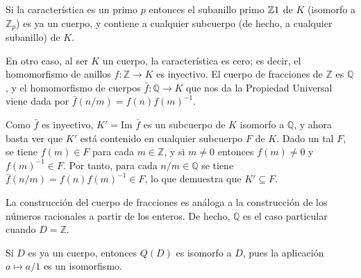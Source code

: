 \begin{proofbox}
Si la característica es un primo \(p\) entonces el subanillo primo \(\mathbb{Z}1\) de \(K\) (isomorfo a \(\mathbb{Z}_p\)) es ya un cuerpo, y contiene a cualquier subcuerpo (de hecho, a cualquier subanillo) de \(K\).

En otro caso, al ser \(K\) un cuerpo, la característica es cero; es decir, el homomorfismo de anillos \(f: \mathbb{Z} \to K\) es inyectivo. El cuerpo de fracciones de \(\mathbb{Z}\) es \(\mathbb{Q}\), y el homomorfismo de cuerpos \(\bar{f}: \mathbb{Q} \to K\) que nos da la Propiedad Universal viene dada por \(\bar{f}(n/m) = f(n)f(m)^{-1}\).

Como \(\bar{f}\) es inyectivo, \(K' = \text{Im } \bar{f}\) es un subcuerpo de \(K\) isomorfo a \(\mathbb{Q}\), y ahora basta ver que \(K'\) está contenido en cualquier subcuerpo \(F\) de \(K\). Dado un tal \(F\), se tiene \(f(m) \in F\) para cada \(m \in \mathbb{Z}\), y si \(m \neq 0\) entonces \(f(m) \neq 0\) y \(f(m)^{-1} \in F\). Por tanto, para cada \(n/m \in \mathbb{Q}\) se tiene \(\bar{f}(n/m) = f(n)f(m)^{-1} \in F\), lo que demuestra que \(K' \subseteq F\).
\end{proofbox}

\begin{remark}
La construcción del cuerpo de fracciones es análoga a la construcción de los números racionales a partir de los enteros. De hecho, \(\mathbb{Q}\) es el caso particular cuando \(D = \mathbb{Z}\).
\end{remark}

\begin{remark}
Si \(D\) es ya un cuerpo, entonces \(Q(D)\) es isomorfo a \(D\), pues la aplicación \(a \mapsto a/1\) es un isomorfismo.
\end{remark}